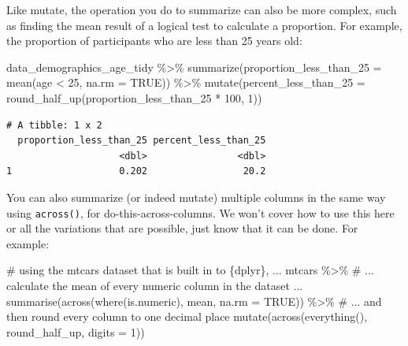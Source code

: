 \documentclass[
  letterpaper,
  DIV=11,
  numbers=noendperiod]{scrreprt}
\newenvironment{Shaded}{\begin{snugshade}}{\end{snugshade}}
\newcommand{\AttributeTok}[1]{\textcolor[rgb]{0.40,0.45,0.13}{#1}}
\newcommand{\CommentTok}[1]{\textcolor[rgb]{0.37,0.37,0.37}{#1}}
\newcommand{\ConstantTok}[1]{\textcolor[rgb]{0.56,0.35,0.01}{#1}}
\newcommand{\DecValTok}[1]{\textcolor[rgb]{0.68,0.00,0.00}{#1}}
\newcommand{\FunctionTok}[1]{\textcolor[rgb]{0.28,0.35,0.67}{#1}}
\newcommand{\NormalTok}[1]{\textcolor[rgb]{0.00,0.23,0.31}{#1}}
\newcommand{\SpecialCharTok}[1]{\textcolor[rgb]{0.37,0.37,0.37}{#1}}
\begin{document}
Like mutate, the operation you do to summarize can also be more complex,
such as finding the mean result of a logical test to calculate a
proportion. For example, the proportion of participants who are less
than 25 years old:

\begin{Shaded}
\begin{Highlighting}[]
\NormalTok{data\_demographics\_age\_tidy }\SpecialCharTok{\%\textgreater{}\%}
  \FunctionTok{summarize}\NormalTok{(}\AttributeTok{proportion\_less\_than\_25 =} \FunctionTok{mean}\NormalTok{(age }\SpecialCharTok{\textless{}} \DecValTok{25}\NormalTok{, }\AttributeTok{na.rm =} \ConstantTok{TRUE}\NormalTok{)) }\SpecialCharTok{\%\textgreater{}\%}
  \FunctionTok{mutate}\NormalTok{(}\AttributeTok{percent\_less\_than\_25 =} \FunctionTok{round\_half\_up}\NormalTok{(proportion\_less\_than\_25 }\SpecialCharTok{*} \DecValTok{100}\NormalTok{, }\DecValTok{1}\NormalTok{))}
\end{Highlighting}
\end{Shaded}

\begin{verbatim}
# A tibble: 1 x 2
  proportion_less_than_25 percent_less_than_25
                    <dbl>                <dbl>
1                   0.202                 20.2
\end{verbatim}

You can also summarize (or indeed mutate) multiple columns in the same
way using \texttt{across()}, for do-this-across-columns. We won't cover
how to use this here or all the variations that are possible, just know
that it can be done. For example:

\begin{Shaded}
\begin{Highlighting}[]
\CommentTok{\# using the mtcars dataset that is built in to \{dplyr\}, ... }
\NormalTok{mtcars }\SpecialCharTok{\%\textgreater{}\%}
  \CommentTok{\# ... calculate the mean of every numeric column in the dataset ...}
  \FunctionTok{summarise}\NormalTok{(}\FunctionTok{across}\NormalTok{(}\FunctionTok{where}\NormalTok{(is.numeric), mean, }\AttributeTok{na.rm =} \ConstantTok{TRUE}\NormalTok{)) }\SpecialCharTok{\%\textgreater{}\%}
  \CommentTok{\# ... and then round every column to one decimal place}
  \FunctionTok{mutate}\NormalTok{(}\FunctionTok{across}\NormalTok{(}\FunctionTok{everything}\NormalTok{(), round\_half\_up, }\AttributeTok{digits =} \DecValTok{1}\NormalTok{))}
\end{Highlighting}
\end{Shaded}
\end{document}
